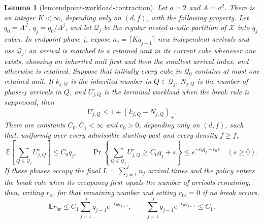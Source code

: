 \documentclass{article}
\newtheorem{lemma}{Lemma}
\begin{document}
\begin{lemma}[lem:endpoint-workload-contraction]\label{lem:endpoint-workload-contraction}
Let \(a=2\) and \(A=a^d\).  There is an integer \(K<\infty\), depending only on \((d,\underline f)\), with the following property.  Let \(q_0=A^J\), \(q_j=q_0/A^j\), and let \(\mathcal Q_j\) be the regular nested \(a\)-adic partition of \(\mathcal X\) into \(q_j\) cubes.  In endpoint phase \(j\), expose \(n_j=\lceil Kq_{j-1}\rceil\) new independent arrivals and use \(\mathcal Q_j\): an arrival is matched to a retained unit in its current cube whenever one exists, choosing an inherited unit first and then the smallest arrival index, and otherwise is retained.  Suppose that initially every cube in \(\mathcal Q_0\) contains at most one retained unit.  If \(k_{j,Q}\) is the inherited number in \(Q\in\mathcal Q_j\), \(N_{j,Q}\) is the number of phase-\(j\) arrivals in \(Q\), and \(U^\circ_{j,Q}\) is the terminal workload when the break rule is suppressed, then
\[
 U^\circ_{j,Q}\le 1+(k_{j,Q}-N_{j,Q})_+ .
\]
There are constants \(C_0,C_1<\infty\) and \(c_0>0\), depending only on \((d,\underline f)\), such that, uniformly over every admissible starting past and every density \(f\ge\underline f\),
\[
 \mathbb E\!\left[\sum_{Q\in\mathcal Q_j}U^\circ_{j,Q}\right]\le C_0q_j,
 \qquad
 \Pr\!\left\{\sum_{Q\in\mathcal Q_j}U^\circ_{j,Q}\ge C_0q_j+s\right\}
 \le e^{-c_0q_j-c_0s}\quad(s\ge0).
\]
If these phases occupy the final \(L=\sum_{j=1}^Jn_j\) arrival times and the policy enters the break rule when its occupancy first equals the number of arrivals remaining, then, writing \(r_{\mathrm{br}}\) for that remaining number and setting \(r_{\mathrm{br}}=0\) if no break occurs,
\[
 \mathbb E r_{\mathrm{br}}
 \le C_1\sum_{j=1}^J q_{j-1}e^{-c_0q_{j-1}},
 \qquad
 \sum_{j=1}^J q_{j-1}e^{-c_0q_{j-1}}\le C_1.
\]
\end{lemma}
\end{document}

